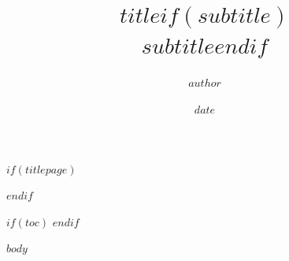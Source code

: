 \documentclass[
    11pt,
    paper=letter, %
    twoside=true, %
    open=right, %
    numbers=enddot, %
    headinclude=true,
    footinclude=false,
    BCOR=12mm, %
    titlepage=true,
    headings=normal, %
    listof=totoc, %
    bibliography=totoc %
]{scrbook}
\title{$title$$if(subtitle)$\\\large\sffamily $subtitle$$endif$}
\author{$author$}
\date{$date$}
\begin{document}
$if(titlepage)$
    \maketitle %
$endif$

$if(toc)$
    \tableofcontents
    \cleardoublepage %
$endif$

$body$
\end{document}

